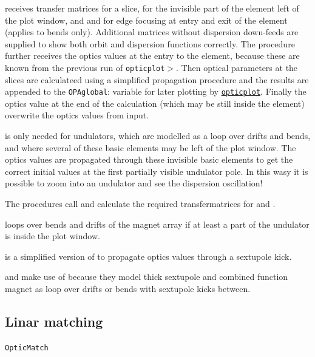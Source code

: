 \documentclass[12pt]{article}
\newcommand\code[1]{{\tt #1}}
\newcommand{\unico}[1]{{\color{burntorange}\code{#1}}}
\newcommand{\prcod}[2]{\opauni{#1}$>$\unico{#2}}
\newcommand{\vrcod}[2]{\opauni{#1}:\unico{#2}}
\newcommand{\opagui}[1]{\colorbox{blue!20}{\code{#1}}}
\newcommand{\oguih}[2]{\subsection{\label{#2}#1}{\Huge\opagui{#2}}\\}
\newcommand{\opauni}[1]{\colorbox{orange!30}{\code{#1}}}
\newcommand{\ouni}[1]{\hyperref[#1]{\opauni{#1}}}
\newcommand{\feature}[1]{{\color{cadmiumgreen} #1}}
\begin{document}
\unico{SlicingN} receives transfer matrices \unico{msl} for a slice, \unico{mof} for the invisible part of the element left of the plot window, and \unico{min} and \unico{mex} for edge focusing at entry and exit of the element (applies to bends only). Additional matrices \unico{mof0,msl0} without dispersion down-feeds are supplied to show both orbit and dispersion functions correctly. The procedure further receives the optics values at the entry to the element, because these are known from the previous run of \prcod{opticplot}{Lattel}. Then optical parameters at the slices are calculateed using a simplified propagation procedure and the results are appended to the \vrcod{OPAglobal}{Curve} variable for later plotting by \ouni{opticplot}. Finally the optics value at the end of the calculation (which may be still inside the element) overwrite the optics values from input.

\unico{SkippingN} is only needed for undulators, which are modelled as a loop over drifts and bends, and where several of these basic elements may be left of the plot window. The optics values are propagated through these invisible basic elements to get the correct initial values at the first partially visible undulator pole. \feature{In this wasy it is possible to zoom into an undulator and see the dispersion oscillation!}

The \unico{Slice(Drift,Quad,Sol,Bend)N} procedures call \unico{SliceSet} and calculate the required transfermatrices for \unico{SlicingN} and \unico{SkippingN}.

\unico{SliceUnduN} loops over bends and drifts of the magnet array if at least a part of the undulator is inside the plot window.

\unico{SextKickN} is a simplified version of \unico{ThinSextupole} to propagate optics values through a sextupole kick.

\unico{SliceSextN} and \unico{SliceCombN} make use of \unico{SextKickN} because they model thick sextupole and combined function magnet as loop over drifts or bends with sextupole kicks between.



\oguih{Linar matching}{OpticMatch} 
\end{document}
